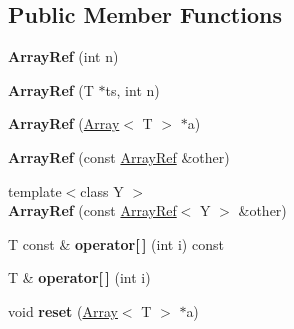 \subsection*{Public Member Functions}
\begin{DoxyCompactItemize}
\item 
\mbox{\label{classzxing_1_1_array_ref_ae25195fec6b5cef4ea8603bf54655874}} 
{\bfseries Array\+Ref} (int n)
\item 
\mbox{\label{classzxing_1_1_array_ref_a8b2665017eb51fcf516f15bfabbf7249}} 
{\bfseries Array\+Ref} (T $\ast$ts, int n)
\item 
\mbox{\label{classzxing_1_1_array_ref_aa86bf9340df8998ea1861ce65b43cd35}} 
{\bfseries Array\+Ref} (\mbox{\hyperlink{classzxing_1_1_array}{Array}}$<$ T $>$ $\ast$a)
\item 
\mbox{\label{classzxing_1_1_array_ref_ac9a17584efd9a2202ab30d74be80bc92}} 
{\bfseries Array\+Ref} (const \mbox{\hyperlink{classzxing_1_1_array_ref}{Array\+Ref}} \&other)
\item 
\mbox{\label{classzxing_1_1_array_ref_ac2c4bd36a4181bdb7292b445752d27ab}} 
{\footnotesize template$<$class Y $>$ }\\{\bfseries Array\+Ref} (const \mbox{\hyperlink{classzxing_1_1_array_ref}{Array\+Ref}}$<$ Y $>$ \&other)
\item 
\mbox{\label{classzxing_1_1_array_ref_a0968e31d08d97407cd54cd7245936ea0}} 
T const  \& {\bfseries operator\mbox{[}$\,$\mbox{]}} (int i) const
\item 
\mbox{\label{classzxing_1_1_array_ref_a90bbbece4a94059a6302dfcebcd61877}} 
T \& {\bfseries operator\mbox{[}$\,$\mbox{]}} (int i)
\item 
\mbox{\label{classzxing_1_1_array_ref_a045f3fbc109a9f0a7b6bb167325ab6df}} 
void {\bfseries reset} (\mbox{\hyperlink{classzxing_1_1_array}{Array}}$<$ T $>$ $\ast$a)
\item 
\mbox{\label{classzxing_1_1_array_ref_a46d5fd5a11beee059124535c1389d998}} 

\end{DoxyCompactItemize}
